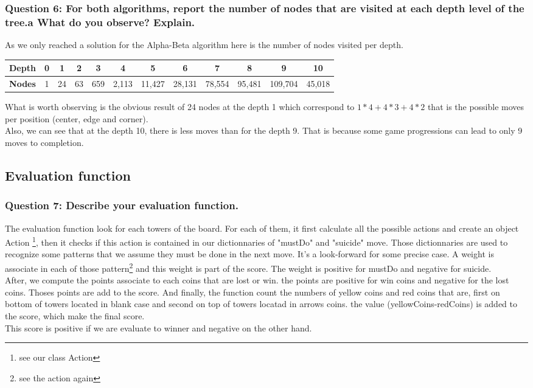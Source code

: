 \documentclass[a4paper,10pt]{article}
\begin{document}
			\subsubsection{Question 6: For both algorithms, report the number of nodes that are visited at each depth level of the tree.a What do you observe? Explain.}
				As we only reached a solution for the Alpha-Beta algorithm here is the number of nodes visited per depth.\\
				\begin{center}
					\begin{tabular}{|c|c|c|c|c|c|c|c|c|c|c|c|}
						\hline 
						\textbf{Depth} & 0 & 1 & 2 & 3 & 4 & 5 & 6 & 7 & 8 & 9 & 10 \\ 
						\hline 
						\textbf{Nodes} & 1 & 24 & 63 & 659 & 2,113 & 11,427 & 28,131 & 78,554 & 95,481 & 109,704 & 45,018 \\ 
						\hline 
					\end{tabular} 
				\end{center}
				What is worth observing is the obvious result of 24 nodes at the depth 1 which correspond to $ 1*4 + 4*3 + 4*2 $ that is the possible moves per position (center, edge and corner).\\
				Also, we can see that at the depth 10, there is less moves than for the depth 9. That is because some game progressions can lead to only 9 moves to completion.
			
			\subsection{Evaluation function}
				\subsubsection{Question 7: Describe your evaluation function.}
				The evaluation function look for each towers of the board. For each of them, it first calculate all the possible actions and create an object Action \footnote{see our class Action}, then it checks if this action is contained in our dictionnaries of "mustDo" and "suicide" move. Those dictionnaries are used to recognize some patterns that we assume they must be done in the next move. It's a look-forward for some precise case. A weight is associate in each of those pattern\footnote{see the action again} and this weight is part of the score. The weight is positive for mustDo and negative for suicide.\\
After, we compute the points associate to each coins that are lost or win. the points are positive for win coins and negative for the lost coins. Thoses points are add to the score.
And finally, the function count the numbers of yellow coins and red coins that are, first on bottom of towers located in blank case and second on top of towers locatad in arrows coins. the value (yellowCoins-redCoins) is added to the score, which make the final score.\\
This score is positive if we are evaluate to winner and negative on the other hand.
\end{document}
